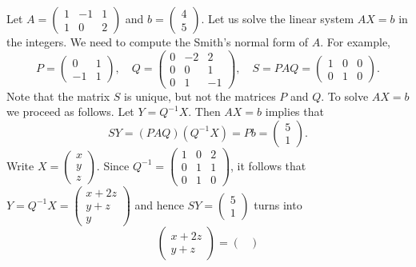 \begin{example}
	Let $A=\begin{pmatrix}
		1 & -1 & 1\\
		1 & 0 & 2
	\end{pmatrix}$ and $b=\begin{pmatrix} 4 \\ 5\end{pmatrix}$. Let us solve
	the linear system $AX=b$ in the integers. We need to compute
	the Smith's normal form of $A$. For example, 
	\[
	P=\begin{pmatrix}
		0 & 1\\
		-1 & 1
	\end{pmatrix},\quad
	Q=\begin{pmatrix}
		0 & -2 & 2\\
		0 & 0 & 1\\
		0 & 1 & -1
	\end{pmatrix},
	\quad
	S=PAQ=\begin{pmatrix}
		1 & 0 & 0\\
		0 & 1 & 0
	\end{pmatrix}.
	\]
	Note that the matrix $S$ is unique, but not the 
	matrices $P$ and $Q$. To solve $AX=b$ we proceed as follows. Let 
	$Y=Q^{-1}X$. Then $AX=b$ implies that 
	\[
		SY=(PAQ)(Q^{-1}X)=Pb=\begin{pmatrix} 5 \\ 1\end{pmatrix}.
	\]	
	Write $X=\begin{pmatrix}
		x\\
		y\\
		z
	\end{pmatrix}$. Since $Q^{-1}=\begin{pmatrix}
		1 & 0 & 2\\
		0 & 1 & 1\\
		0 & 1 & 0
	\end{pmatrix}$, it follows that  
	$Y=Q^{-1}X=\begin{pmatrix}
		x+2z\\
		y+z\\
		y
	\end{pmatrix}$ and hence $SY=\begin{pmatrix}5\\1\end{pmatrix}$ turns into 
	\[
		\begin{pmatrix}
			x+2z\\
			y+z
		\end{pmatrix}
		=
	\begin{pmatrix}

\end{pmatrix}\]
\end{example}
